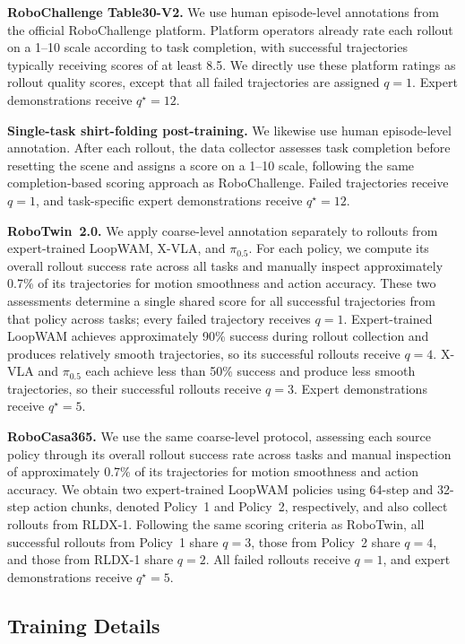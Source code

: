 \textbf{RoboChallenge Table30-V2.}
We use human episode-level annotations from the official RoboChallenge platform.
Platform operators already rate each rollout on a 1--10 scale according to task completion, with successful trajectories typically receiving scores of at least 8.5.
We directly use these platform ratings as rollout quality scores, except that all failed trajectories are assigned $q=1$.
Expert demonstrations receive $q^\star=12$.

\textbf{Single-task shirt-folding post-training.}
We likewise use human episode-level annotation.
After each rollout, the data collector assesses task completion before resetting the scene and assigns a score on a 1--10 scale, following the same completion-based scoring approach as RoboChallenge.
Failed trajectories receive $q=1$, and task-specific expert demonstrations receive $q^\star=12$.

\textbf{RoboTwin~2.0.}
We apply coarse-level annotation separately to rollouts from expert-trained LoopWAM, X-VLA, and $\pi_{0.5}$.
For each policy, we compute its overall rollout success rate across all tasks and manually inspect approximately 0.7\% of its trajectories for motion smoothness and action accuracy.
These two assessments determine a single shared score for all successful trajectories from that policy across tasks; every failed trajectory receives $q=1$.
Expert-trained LoopWAM achieves approximately 90\% success during rollout collection and produces relatively smooth trajectories, so its successful rollouts receive $q=4$.
X-VLA and $\pi_{0.5}$ each achieve less than 50\% success and produce less smooth trajectories, so their successful rollouts receive $q=3$.
Expert demonstrations receive $q^\star=5$.

\textbf{RoboCasa365.}
We use the same coarse-level protocol, assessing each source policy through its overall rollout success rate across tasks and manual inspection of approximately 0.7\% of its trajectories for motion smoothness and action accuracy.
We obtain two expert-trained LoopWAM policies using 64-step and 32-step action chunks, denoted Policy~1 and Policy~2, respectively, and also collect rollouts from RLDX-1.
Following the same scoring criteria as RoboTwin, all successful rollouts from Policy~1 share $q=3$, those from Policy~2 share $q=4$, and those from RLDX-1 share $q=2$.
All failed rollouts receive $q=1$, and expert demonstrations receive $q^\star=5$.

\subsection{Training Details}

